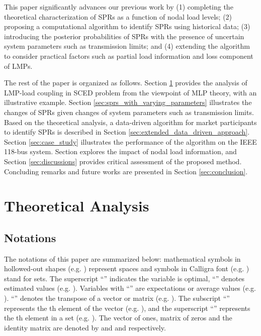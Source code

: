 \documentclass[letterpaper, 11pt]{article}
\theoremstyle{plain}
\theoremstyle{definition}
\begin{document}
This paper significantly advances our previous work by (1) completing the theoretical characterization of SPRs as a function of nodal load levels; (2) proposing a computational algorithm to identify SPRs using historical data; (3) introducing the posterior probabilities of SPRs with the presence of uncertain system parameters such as transmission limits; and (4) extending the algorithm to consider practical factors such as partial load information and loss component of LMPs.
 


The rest of the paper is organized as follows. 
Section \ref{sec:theoretical_analysis} provides the analysis of LMP-load coupling in SCED problem from the viewpoint of MLP theory, with an illustrative example. 
Section \ref{sec:sprs_with_varying_parameters} illustrates the changes of SPRs given changes of system parameters such as transmission limits. 
Based on the theoretical analysis, a data-driven algorithm for market participants to identify SPRs is described in Section \ref{sec:extended_data_driven_approach}. 
Section \ref{sec:case_study} illustrates the performance of the algorithm on the IEEE 118-bus system.
Section explores the impact of nodal load information, and Section \ref{sec:discussions} provides critical assessment
of the proposed method. Concluding remarks and future works
are presented in Section \ref{sec:conclusion}.











\section{Theoretical Analysis} \label{sec:theoretical_analysis}
\subsection{Notations} \label{sub:notations}
The notations of this paper are summarized below: mathematical symbols in hollowed-out shapes (e.g. ) represent spaces and symbols in Calligra font (e.g. ) stand for sets. The superscript ``'' indicates the variable is optimal, ``'' denotes estimated values (e.g. ). Variables with ``'' are expectations or average values (e.g. ). ``'' denotes the transpose of a vector or matrix (e.g. ). The subscript ``'' represents the th element of the vector (e.g. ), and the superscript ``'' represents the th element in a set (e.g. ).
The vector of  ones, matrix of  zeros and the  identity matrix are denoted by  and  and  respectively.
\end{document}
